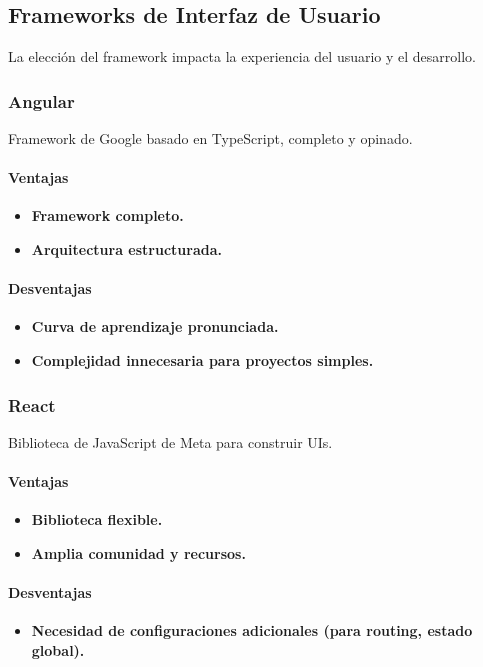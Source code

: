 \subsection{Frameworks de Interfaz de Usuario}
La elección del framework impacta la experiencia del usuario y el desarrollo.

\subsubsection{Angular}
Framework de Google basado en TypeScript, completo y opinado.
\paragraph{Ventajas}
\begin{itemize}
    \item \textbf{Framework completo.}
    \item \textbf{Arquitectura estructurada.}
\end{itemize}
\paragraph{Desventajas}
\begin{itemize}
    \item \textbf{Curva de aprendizaje pronunciada.}
    \item \textbf{Complejidad innecesaria para proyectos simples.}
\end{itemize}

\subsubsection{React}
Biblioteca de JavaScript de Meta para construir UIs.
\paragraph{Ventajas}
\begin{itemize}
    \item \textbf{Biblioteca flexible.}
    \item \textbf{Amplia comunidad y recursos.}
\end{itemize}
\paragraph{Desventajas}
\begin{itemize}
    \item \textbf{Necesidad de configuraciones adicionales (para routing, estado global).}
\end{itemize}

